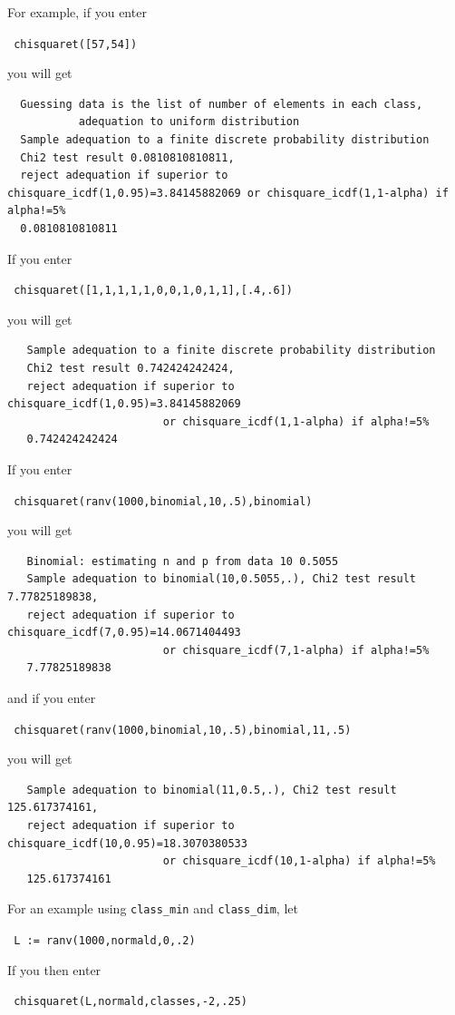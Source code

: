 \documentclass[a4paper,11pt]{book}
\begin{document}
For example, if you enter
\begin{center}
  \tt
  chisquaret([57,54])
\end{center}
you will get
\begin{verbatim}
  Guessing data is the list of number of elements in each class, 
           adequation to uniform distribution
  Sample adequation to a finite discrete probability distribution
  Chi2 test result 0.0810810810811,
  reject adequation if superior to chisquare_icdf(1,0.95)=3.84145882069 or chisquare_icdf(1,1-alpha) if alpha!=5%
  0.0810810810811
\end{verbatim}
If you enter
\begin{center}
  \tt
  chisquaret([1,1,1,1,1,0,0,1,0,1,1],[.4,.6])
\end{center}
you will get
\begin{verbatim}
   Sample adequation to a finite discrete probability distribution
   Chi2 test result 0.742424242424,
   reject adequation if superior to chisquare_icdf(1,0.95)=3.84145882069 
                        or chisquare_icdf(1,1-alpha) if alpha!=5%
   0.742424242424
\end{verbatim}
If you enter
\begin{center}
  \tt
  chisquaret(ranv(1000,binomial,10,.5),binomial)
\end{center}
you will get
\begin{verbatim}
   Binomial: estimating n and p from data 10 0.5055
   Sample adequation to binomial(10,0.5055,.), Chi2 test result 7.77825189838,
   reject adequation if superior to chisquare_icdf(7,0.95)=14.0671404493 
                        or chisquare_icdf(7,1-alpha) if alpha!=5%
   7.77825189838
\end{verbatim}
and if you enter
\begin{center}
  \tt
  chisquaret(ranv(1000,binomial,10,.5),binomial,11,.5)
\end{center}
you will get
\begin{verbatim}
   Sample adequation to binomial(11,0.5,.), Chi2 test result 125.617374161,
   reject adequation if superior to chisquare_icdf(10,0.95)=18.3070380533 
                        or chisquare_icdf(10,1-alpha) if alpha!=5%
   125.617374161
\end{verbatim}
For an example using \texttt{class\_min} and \texttt{class\_dim}, let
\begin{center}
  \tt
  L := ranv(1000,normald,0,.2)
\end{center}
If you then enter
\begin{center}
  \tt
  chisquaret(L,normald,classes,-2,.25)
\end{center}
\end{document}
